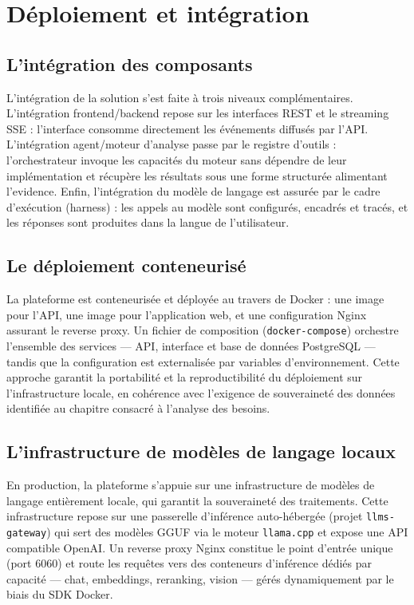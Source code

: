 \section{Déploiement et intégration}

\subsection{L'intégration des composants}

L'intégration de la solution s'est faite à trois niveaux complémentaires. L'intégration frontend/backend repose sur les interfaces REST et le streaming SSE : l'interface consomme directement les événements diffusés par l'API. L'intégration agent/moteur d'analyse passe par le registre d'outils : l'orchestrateur invoque les capacités du moteur sans dépendre de leur implémentation et récupère les résultats sous une forme structurée alimentant l'evidence. Enfin, l'intégration du modèle de langage est assurée par le cadre d'exécution (harness) : les appels au modèle sont configurés, encadrés et tracés, et les réponses sont produites dans la langue de l'utilisateur.

\subsection{Le déploiement conteneurisé}

La plateforme est conteneurisée et déployée au travers de Docker : une image pour l'API, une image pour l'application web, et une configuration Nginx assurant le reverse proxy. Un fichier de composition (\texttt{docker-compose}) orchestre l'ensemble des services — API, interface et base de données PostgreSQL — tandis que la configuration est externalisée par variables d'environnement. Cette approche garantit la portabilité et la reproductibilité du déploiement sur l'infrastructure locale, en cohérence avec l'exigence de souveraineté des données identifiée au chapitre consacré à l'analyse des besoins.

\subsection{L'infrastructure de modèles de langage locaux}

En production, la plateforme s'appuie sur une infrastructure de modèles de langage entièrement locale, qui garantit la souveraineté des traitements. Cette infrastructure repose sur une passerelle d'inférence auto-hébergée (projet \texttt{llms-gateway}) qui sert des modèles GGUF via le moteur \texttt{llama.cpp} et expose une API compatible OpenAI. Un reverse proxy Nginx constitue le point d'entrée unique (port 6060) et route les requêtes vers des conteneurs d'inférence dédiés par capacité — chat, embeddings, reranking, vision — gérés dynamiquement par le biais du SDK Docker.


